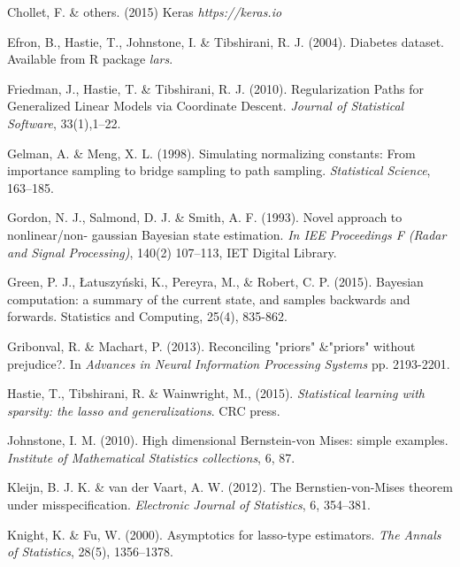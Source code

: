 \documentclass[12pt]{TD-CJS}
\begin{document}
\begin{thebibliography}{}
Chollet, F. \& others. (2015) Keras {\it https://keras.io}

Efron, B., Hastie, T., Johnstone, I. \& Tibshirani, R. J. (2004).  Diabetes dataset. Available from R package {\it lars}.

Friedman, J.,  Hastie, T. \& Tibshirani, R. J. (2010). Regularization Paths for Generalized Linear Models via Coordinate Descent. {\it Journal of Statistical Software}, 33(1),1--22.

Gelman, A. \& Meng, X. L. (1998). Simulating normalizing constants: From importance sampling to bridge sampling to path sampling. {\it Statistical Science}, 163--185.

Gordon, N. J.,  Salmond, D. J. \& Smith, A. F. (1993). Novel approach to nonlinear/non- gaussian Bayesian state estimation. {\it In IEE Proceedings F (Radar and Signal Processing)}, 140(2) 107--113, IET Digital Library.


Green, P. J., {\L}atuszy{\'n}ski, K., Pereyra, M., \& Robert, C. P. (2015). Bayesian computation: a summary of the current state, and samples backwards and forwards. Statistics and Computing, 25(4), 835-862.

Gribonval, R. \& Machart, P. (2013). 
Reconciling "priors" \&"priors" without prejudice?. In {\em Advances in Neural Information Processing Systems} 
pp. 2193-2201.


Hastie, T., Tibshirani, R. \& Wainwright, M., (2015). {\em Statistical learning with sparsity: the lasso and generalizations}. CRC press.


Johnstone, I. M. (2010). High dimensional Bernstein-von Mises: simple examples. {\it Institute of Mathematical Statistics collections}, 6, 87.

Kleijn, B. J. K. \& van der Vaart, A. W. (2012). The Bernstien-von-Mises theorem
under misspecification. {\em Electronic Journal of Statistics}, 6, 354--381.

Knight, K. \& Fu, W. (2000). Asymptotics for lasso-type estimators.
 {\em The Annals of Statistics}, 28(5), 1356--1378.


\end{thebibliography}
\end{document}
